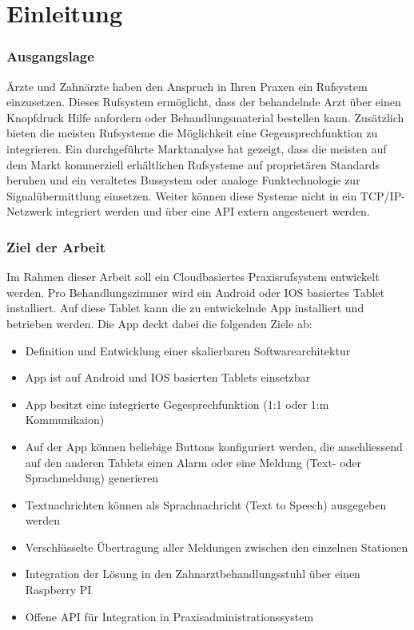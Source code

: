 \section{Einleitung}

\subsubsection*{Ausgangslage}

Ärzte und Zahnärzte haben den Anspruch in Ihren Praxen ein Rufsystem einzusetzen.
Dieses Rufsystem ermöglicht, dass der behandelnde Arzt über einen Knopfdruck Hilfe anfordern oder Behandlungsmaterial bestellen kann.
Zusätzlich bieten die meisten Rufsysteme die Möglichkeit eine Gegensprechfunktion zu integrieren.
Ein durchgeführte Marktanalyse hat gezeigt, dass die meisten auf dem Markt kommerziell erhältlichen Rufsysteme auf proprietären Standards beruhen und ein veraltetes Bussystem oder analoge Funktechnologie zur Signalübermittlung einsetzen.
Weiter können diese Systeme nicht in ein TCP/IP-Netzwerk integriert werden und über eine API extern angesteuert werden.

\subsubsection*{Ziel der Arbeit}

Im Rahmen dieser Arbeit soll ein Cloudbasiertes Praxisrufsystem entwickelt werden.
Pro Behandlungszimmer wird ein Android oder IOS basiertes Tablet installiert. Auf diese Tablet kann die zu entwickelnde App installiert und betrieben werden. Die App deckt dabei die folgenden Ziele ab:

\begin{itemize}
    \item Definition und Entwicklung einer skalierbaren Softwarearchitektur
    \item App ist auf Android und IOS basierten Tablets einsetzbar
    \item App besitzt eine integrierte Gegesprechfunktion (1:1 oder 1:m Kommunikaion)
    \item Auf der App können beliebige Buttons konfiguriert werden, die anschliessend auf den anderen Tablets einen Alarm oder eine Meldung (Text- oder Sprachmeldung) generieren
    \item Textnachrichten können als Sprachnachricht (Text to Speech) ausgegeben werden
    \item Verschlüsselte Übertragung aller Meldungen zwischen den einzelnen Stationen
    \item Integration der Lösung in den Zahnarztbehandlungsstuhl über einen Raspberry PI
    \item Offene API für Integration in Praxisadministrationssystem
\end{itemize}

